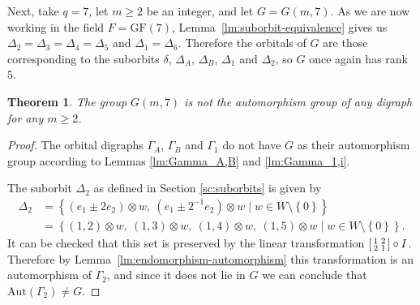 \documentclass[10pt]{amsart}
\theoremstyle{definition}
\theoremstyle{plain}
\theoremstyle{plain}
\theoremstyle{plain}
\newtheorem{theorem}[theorem]{Theorem}
\theoremstyle{plain}
\newcommand{\Aut}{\mathrm{Aut}}
\newcommand{\GF}{\mathrm{GF}}
\begin{document}
Next, take $q=7$, let $m \geqslant 2$ be an integer, and let $G = G{\left(m, 7 \right)}$. As we are now working in the field $F = \GF {\left(7 \right)}$, Lemma~\ref{lm:suborbit-equivalence} gives us $\Delta_2 = \Delta_3 = \Delta_4 = \Delta_5$ and $\Delta_1 = \Delta_6$. Therefore the orbitals of $G$ are those corresponding to the suborbits $\delta$, $\Delta_A$, $\Delta_B$, $\Delta_1$ and $\Delta_2$, so $G$ once again has rank $5$.

\begin{theorem} \label{thm:q=7}
The group $G{\left(m, 7 \right)}$ is not the automorphism group of any digraph for any $m \geqslant 2$.
\end{theorem}
\begin{proof}
The orbital digraphs $\Gamma_A$, $\Gamma_B$ and $\Gamma_1$ do not have $G$ as their automorphism group according to Lemmas \ref{lm:Gamma_A,B} and \ref{lm:Gamma_1,i}.

The suborbit $\Delta_2$ as defined in Section \ref{sc:suborbits} is given by
\begin{align*}
\Delta_2 &= \left\{\left(e_1 \pm 2 e_2 \right) \otimes w,\ \left(e_1 \pm 2^{-1} e_2 \right) \otimes w \mid w \in W \setminus \left\{0 \right\}\right\} \\
&= \left\{\left(1, 2 \right) \otimes w,\ \left(1, 3 \right) \otimes w,\ \left(1, 4 \right) \otimes w,\ \left(1, 5 \right) \otimes w \mid w \in W \setminus \left\{0 \right\}\right\}.
\end{align*}
It can be checked that this set is preserved by the linear transformation $\begin{bsmallmatrix} 1 & 2 \\ 2 & 1 \end{bsmallmatrix} \circ I$. Therefore by Lemma~\ref{lm:endomorphism-automorphism} this transformation is an automorphism of $\Gamma_2$, and since it does not lie in $G$ we can conclude that $\Aut(\Gamma_2) \neq G$.


\end{proof}
\end{document}
